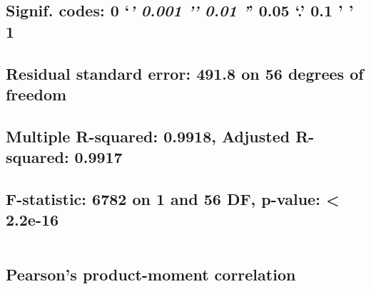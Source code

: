 \documentclass[
  12pt,
]{article}
\begin{document}
\hypertarget{signif.-codes-0-0.001-0.01-0.05-.-0.1-1-1}{%
\subsection{\texorpdfstring{Signif. codes: 0 `\emph{\textbf{' 0.001 '}'
0.01 '}' 0.05 `.' 0.1 ' '
1}{Signif. codes: 0 `\,' 0.001 '\,' 0.01 '\,' 0.05 `.' 0.1 ' ' 1}}\label{signif.-codes-0-0.001-0.01-0.05-.-0.1-1-1}}

\hypertarget{section-19}{%
\subsection{}\label{section-19}}

\hypertarget{residual-standard-error-491.8-on-56-degrees-of-freedom}{%
\subsection{Residual standard error: 491.8 on 56 degrees of
freedom}\label{residual-standard-error-491.8-on-56-degrees-of-freedom}}

\hypertarget{multiple-r-squared-0.9918-adjusted-r-squared-0.9917}{%
\subsection{Multiple R-squared: 0.9918, Adjusted R-squared:
0.9917}\label{multiple-r-squared-0.9918-adjusted-r-squared-0.9917}}

\hypertarget{f-statistic-6782-on-1-and-56-df-p-value-2.2e-16}{%
\subsection{F-statistic: 6782 on 1 and 56 DF, p-value: \textless{}
2.2e-16}\label{f-statistic-6782-on-1-and-56-df-p-value-2.2e-16}}

\begin{verbatim}
\end{verbatim}

\hypertarget{section-20}{%
\subsection{}\label{section-20}}

\hypertarget{pearsons-product-moment-correlation-2}{%
\subsection{Pearson's product-moment
correlation}\label{pearsons-product-moment-correlation-2}}
\end{document}
